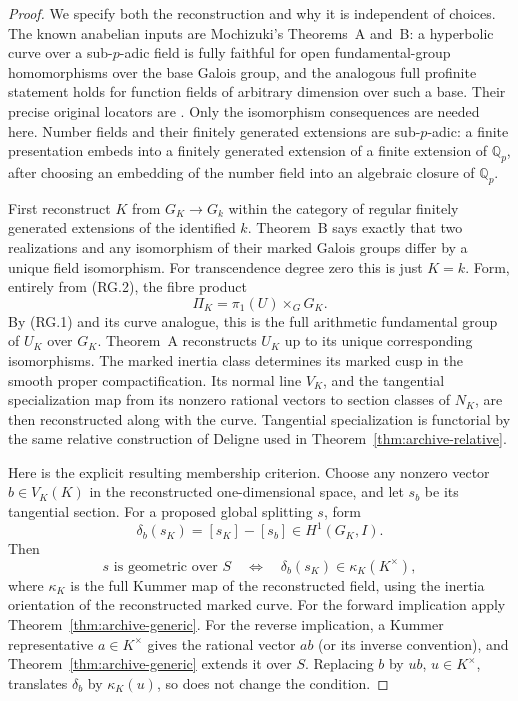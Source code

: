\documentclass[11pt,a4paper]{article}
\theoremstyle{definition}
\begin{document}
\begin{proof}
We specify both the reconstruction and why it is independent of
choices. The known anabelian inputs are Mochizuki's Theorems~A
and~B: a hyperbolic curve over a sub-$p$-adic field is fully faithful
for open fundamental-group homomorphisms over the base Galois
group, and the analogous full profinite statement holds for
function fields of arbitrary dimension over such a base.
Their precise original locators are
\cite[Theorem~A, p.~3; Theorem~B, p.~4;
Theorem~16.5 and the following profinite argument, p.~86;
Theorem~17.1 and proof, p.~87]{MochizukiLocal1999}.
Only the isomorphism consequences are needed here.
Number fields and their finitely generated extensions are sub-$p$-adic:
a finite presentation embeds into a finitely generated extension
of a finite extension of $\mathbb Q_p$, after choosing an
embedding of the number field into an algebraic closure of
$\mathbb Q_p$.

First reconstruct $K$ from $G_K\to G_k$ within the category of
regular finitely generated extensions of the identified $k$.
Theorem~B says exactly that two realizations and any isomorphism
of their marked Galois groups differ by a unique field isomorphism.
For transcendence degree zero this is just $K=k$.
Form, entirely from \textup{(RG.2)}, the fibre product
\[
 \Pi_K=\pi_1(U)\mathbin{\times}_G G_K.
\]
By (RG.1) and its curve analogue, this is the full arithmetic
fundamental group of $U_K$ over $G_K$. Theorem~A reconstructs
$U_K$ up to its unique corresponding isomorphisms. The marked
inertia class determines its marked cusp in the smooth proper
compactification. Its normal line $V_K$, and the tangential
specialization map from its nonzero rational vectors to section
classes of $N_K$, are then reconstructed along with the curve.
Tangential specialization is functorial by the same relative
construction of Deligne used in Theorem~\ref{thm:archive-relative}.

Here is the explicit resulting membership criterion. Choose any
nonzero vector $b\in V_K(K)$ in the reconstructed one-dimensional
space, and let $s_b$ be its tangential section. For a proposed
global splitting $s$, form
\[
 \delta_b(s_K)=[s_K]-[s_b]\in H^1(G_K,I).
\]
Then
\[
 s\text{ is geometric over }S
 \quad\Longleftrightarrow\quad
 \delta_b(s_K)\in
 \kappa_K(K^\times),                                      \tag{RG.3}
\]
where $\kappa_K$ is the full Kummer map of the reconstructed field,
using the inertia orientation of the reconstructed marked curve.
For the forward implication apply Theorem~\ref{thm:archive-generic}.
For the reverse implication, a Kummer representative $a\in K^\times$
gives the rational vector $ab$ (or its inverse convention), and
Theorem~\ref{thm:archive-generic} extends it over $S$.
Replacing $b$ by $ub$, $u\in K^\times$, translates
$\delta_b$ by $\kappa_K(u)$, so does not change the condition.


\end{proof}
\end{document}
